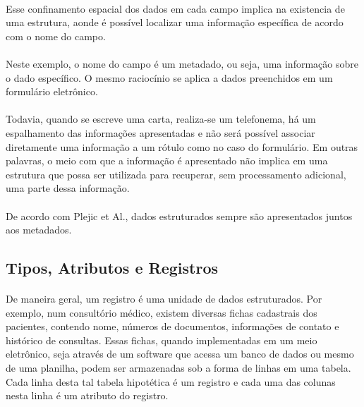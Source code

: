\paragraph{} Esse confinamento espacial dos dados em cada campo implica na existencia de uma estrutura, aonde é possível localizar uma informação específica de acordo com o nome do campo.

\paragraph{} Neste exemplo, o nome do campo é um metadado, ou seja, uma informação sobre o dado específico. O mesmo raciocínio se aplica a dados preenchidos em um formulário eletrônico.

\paragraph{} Todavia, quando se escreve uma carta, realiza-se um telefonema, há um espalhamento das informações apresentadas e não será possível associar diretamente uma informação a um rótulo como no caso do formulário. Em outras palavras, o meio com que a informação é apresentado não implica em uma estrutura que possa ser utilizada para recuperar, sem processamento adicional, uma parte dessa informação.

\paragraph{} De acordo com Plejic et Al., dados estruturados sempre são apresentados juntos aos metadados\cite{plejic2008}.

\subsection{Tipos, Atributos e Registros}

\paragraph{} De maneira geral, um registro é uma unidade de dados estruturados. Por exemplo, num consultório médico, existem
diversas fichas cadastrais dos pacientes, contendo nome, números de documentos, informações de contato e histórico de consultas. Essas fichas, quando implementadas em um meio eletrônico, seja através de um software que acessa um banco de dados ou mesmo de uma planilha, podem ser armazenadas sob a forma de linhas em uma tabela. Cada linha desta tal tabela hipotética é um registro e cada uma das colunas nesta linha é um atributo do registro.

